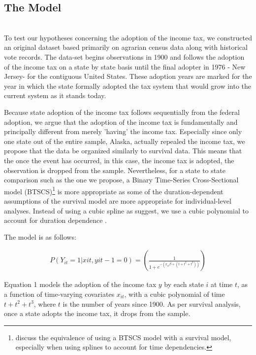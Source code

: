 \documentclass[letter, 12pt]{article}
\begin{document}
\subsection{The Model}\hfill\\

To test our hypotheses concerning the adoption of the income tax, we constructed an original dataset based primarily on agrarian census data along with historical vote records. The data-set begins observations in 1900 and follows the adoption of the income tax on a state by state basis until the final adopter in 1976 - New Jersey- for the contiguous United States. These adoption years are marked for the year in which the state formally adopted the tax system that would grow into the current system as it stands today. 

Because state adoption of the income tax follows sequentially from the federal adoption, we argue that the adoption of the income tax is fundamentally and principally different from merely 'having' the income tax. Especially since only one state out of the entire sample, Alaska, actually repealed the income tax, we propose that the data be organized similarly to survival data. This means that the once the event has occurred, in this case, the income tax is adopted, the observation is dropped from the sample. Nevertheless, for a state to state comparison such as the one we propose, a Binary Time-Series Cross-Sectional model (BTSCS)\footnote{\citealt{beck1998taking} discuss the equivalence of using a BTSCS model with a survival model, especially when using splines to account for time dependencies.}  is more appropriate as some of the duration-dependent assumptions of the survival model are more appropriate for individual-level analyses. Instead of using a cubic spline as \citealt{beck1998taking} suggest, we use a cubic polynomial to account for duration dependence \cite{carter2010back}. 

The model is as follows: 

\begin{align}
P(Y_{it} = 1 | x{it}, y{it-1} = 0) = (\frac{1}{1 + e^{-(x_{it}\beta + (t + t^2 + t^3))}})
\end{align}

Equation 1 models the adoption of the income tax $y$ by each state $i$ at time $t$, as a function of time-varying covariates $x_{it}$, with a cubic polynomial of time $t + t^2 + t^3$, where $t$ is the number of years since 1900. As per survival analysis, once a state adopts the income tax, it drops from the sample. 
\end{document}
